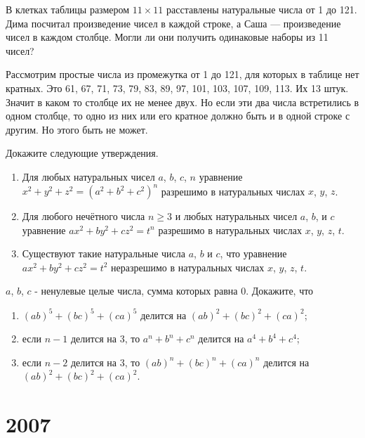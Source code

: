 \documentclass[11pt, a4paper]{common/document_template}
\begin{document}
\begin{exercise}[1981]
В клетках таблицы размером $11 \times 11$ расставлены натуральные числа от 1 до 121. Дима посчитал произведение чисел в каждой строке, а Саша — произведение чисел в каждом столбце. Могли ли они получить одинаковые наборы из 11 чисел?
\end{exercise}

\begin{Solution}
Рассмотрим простые числа из промежутка от 1 до 121, для которых в таблице нет кратных. Это 61, 67, 71, 73, 79, 83, 89, 97, 101, 103, 107, 109, 113. Их 13 штук. Значит в каком то столбце их не менее двух. Но если эти два числа встретились в одном столбце, то одно из них или его кратное должно быть и в одной строке с другим. Но этого быть не может.  
\end{Solution}

\begin{exercise}[2003]
Докажите следующие утверждения.
\begin{enumerate}
\item Для любых натуральных чисел $a$, $b$, $c$, $n$ уравнение $x^{2} + y^{2} + z^{2} = (a^{2} + b^{2} + c^{2})^{n}$ разрешимо в натуральных числах $x$, $y$, $z$.
\item Для любого нечётного числа $n \geqslant 3$ и любых натуральных чисел $a$, $b$, и $c$ уравнение $ax^{2} + by^{2} + cz^{2} = t^{n}$ разрешимо в натуральных числах $x$, $y$, $z$, $t$.
\item Существуют такие натуральные числа $a$, $b$ и $c$, что уравнение $ax^{2} + by^{2} + cz^{2} = t^{2}$ неразрешимо в натуральных числах $x$, $y$, $z$, $t$.
\end{enumerate}
\end{exercise}

\begin{exercise}[2023]
$a$, $b$, $c$ - ненулевые целые числа, сумма которых равна 0. Докажите, что
\begin{enumerate}
\item $(ab)^{5} + (bc)^{5} + (ca)^{5}$ делится на $(ab)^{2} + (bc)^{2} + (ca)^{2}$;
\item если $n - 1$ делится на 3, то $a^{n} + b^{n} + c^{n}$ делится на $a^{4} + b^{4} + c^{4}$;
\item если $n - 2$ делится на 3, то $(ab)^{n} + (bc)^{n} + (ca)^{n}$ делится на $(ab)^{2} + (bc)^{2} + (ca)^{2}$.
\end{enumerate}
\end{exercise}

\chapter{2007}
\end{document}
